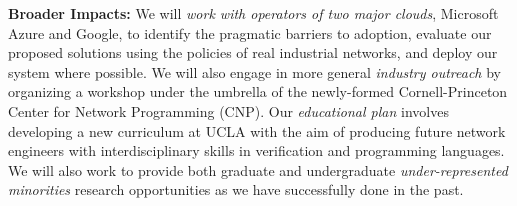 \documentclass[12pt]{article}
\begin{document}
\noindent
\textbf{Broader Impacts:} 
We will 
\emph{work with
operators of two major clouds}, Microsoft Azure and Google,
to identify the pragmatic barriers to adoption, evaluate our proposed solutions using the policies of real industrial networks, and deploy our system where possible.   We will also engage in more general \emph{industry outreach}
by organizing a workshop under
the umbrella of the newly-formed
Cornell-Princeton Center for Network Programming (CNP).
Our \emph{educational plan} involves
developing a new curriculum at UCLA with the aim of producing
future network engineers with interdisciplinary skills in verification
and programming languages.  
We will also work to provide both
graduate and undergraduate
\emph{under-represented minorities} research opportunities as we
have successfully done in the past.
\end{document}

